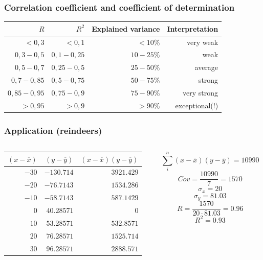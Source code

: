 \documentclass{beamer}
\begin{document}
\begin{frame}
  \frametitle{Correlation coefficient and coefficient of determination}
  \begin{table}[h] \centering
    \begin{tabular}{@{}|r|r|r|r|@{}}
    	\toprule
    	          $R$ &       $R^{2}$ & Explained variance &   Interpretation \\ \midrule
    	      $< 0,3$ &       $< 0,1$ &           $< 10\%$ &        very weak \\
    	  $0,3 - 0,5$ & $0,1 - 0,25$ &        $10 - 25\%$ &             weak \\
    	  $0,5 - 0,7$ &  $0,25 - 0,5$ &        $25 - 50\%$ &          average \\
    	 $0,7 - 0,85$ &  $0,5 - 0,75$ &        $50 - 75\%$ &           strong \\
    	$0,85 - 0,95$ &  $0,75 - 0,9$ &        $75 - 90\%$ &      very strong \\
    	     $> 0,95$ &       $> 0,9$ &            $>90\%$ & exceptional(!) \\ \bottomrule
    \end{tabular}
  \end{table}

\end{frame}

\begin{frame}
  \frametitle{Application (reindeers)}
  \begin{columns}
    \begin{column}{0.5\textwidth}
      \begin{table}[h] \centering
        \begin{tabular}{@{}rrr@{}} \toprule
          $(x-\overline{x})$ & $(y - \overline{y})$ & $(x-\overline{x})(y - \overline{y})$ \\
          \midrule
          $-30$ & $-130.714$ & $3921.429$ \\
          $-20$ & $-76.7143$ & $1534.286$ \\
          $-10$ & $-58.7143$ & $587.1429$\\
          $0$   & $40.28571$ & $0$\\
          $10$  & $53.28571$ & $532.8571$\\
          $20$  & $76.28571$ & $1525.714$\\
          $30$  & $96.28571$ & $2888.571$\\
          \bottomrule
        \end{tabular}
      \end{table}
    \end{column}
    \begin{column}{0.5\textwidth}
      \[ \sum_{i}^{n} (x-\overline{x})(y - \overline{y}) = 10990 \]
      \[ Cov = \frac{10990}{7} = 1570 \]
      \[ \sigma_{x} = 20 \]
      \[ \sigma_{y} = 81.03 \]
      \[ R = \frac{1570}{20 \cdot 81.03} = 0.96 \]
      \[ R^{2} = 0.93 \]
    \end{column}
  \end{columns}
\end{frame}
\end{document}
